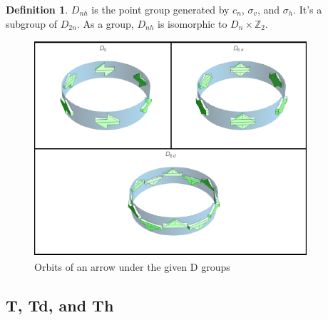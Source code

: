 \documentclass[12pt, letterpaper]{article}
\theoremstyle{definition} %
\newtheorem{defn}[thm]{Definition} %
\begin{document}
\begin{defn}
  $D_{nh}$ is the point group generated by $c_n$, $\sigma_v$, and $\sigma_h$. It's a subgroup of $D_{2n}$.
  As a group, $D_{nh}$ is isomorphic to $D_n \times \mathbb{Z}_2$. 
\end{defn}


\begin{figure}[H]
\centering
\includegraphics[width=0.9\textwidth]{figureD}
\caption{Orbits of an arrow under the given D groups}

\label{figure-d}
\end{figure}

\subsection{T, Td, and Th}
\end{document}
